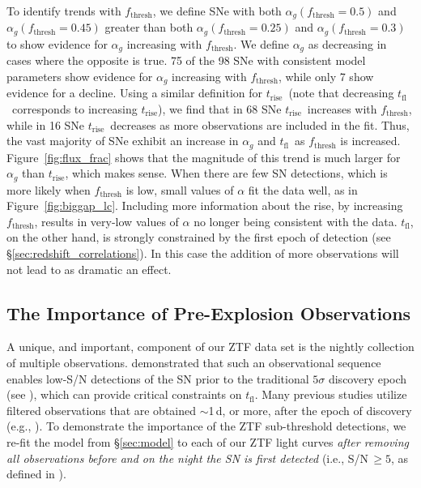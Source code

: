 \documentclass[twocolumn]{./aastex63}
\newcommand{\tfl}{$t_\mathrm{fl}$}
\newcommand{\trise}{$t_\mathrm{rise}$}
\begin{document}
To identify trends with $f_\mathrm{thresh}$, we define SNe with both
$\alpha_g(f_\mathrm{thresh} = 0.5)$ and $\alpha_g(f_\mathrm{thresh} = 0.45)$
greater than both $\alpha_g(f_\mathrm{thresh} = 0.25)$ and
$\alpha_g(f_\mathrm{thresh} = 0.3)$ to show evidence for $\alpha_g$ increasing
with $f_\mathrm{thresh}$. We define $\alpha_g$ as decreasing in cases where
the opposite is true. 75 of the 98 SNe with consistent model parameters show
evidence for $\alpha_g$ increasing with $f_\mathrm{thresh}$, while only 7 show
evidence for a decline. Using a similar definition for \trise\ (note that
decreasing \tfl\ corresponds to increasing \trise), we find that in 68 SNe
\trise\ increases with $f_\mathrm{thresh}$, while in 16 SNe \trise\ decreases
as more observations are included in the fit. Thus, the vast majority of SNe
exhibit an increase in $\alpha_g$ and \tfl\ as $f_\mathrm{thresh}$ is
increased. Figure~\ref{fig:flux_frac} shows that the magnitude of this trend
is much larger for $\alpha_g$ than \trise, which makes sense. When there are
few SN detections, which is more likely when $f_\mathrm{thresh}$ is low, small
values of $\alpha$ fit the data well, as in Figure~\ref{fig:biggap_lc}.
Including more information about the rise, by increasing $f_\mathrm{thresh}$,
results in very-low values of $\alpha$ no longer being consistent with the
data. \tfl, on the other hand, is strongly constrained by the first epoch of
detection (see \S\ref{sec:redshift_correlations}). In this case the addition
of more observations will not lead to as dramatic an effect.

\subsection{The Importance of Pre-Explosion Observations}\label{sec:pre_explosion}

A unique, and important, component of our ZTF data set is the nightly
collection of multiple observations. \citet{Yao19} demonstrated that such an
observational sequence enables low-S/N detections of the SN prior to the
traditional $5\sigma$ discovery epoch (see \citealt{Masci19}), which can
provide critical constraints on \tfl. Many previous studies utilize filtered
observations that are obtained $\sim$1\,d, or more, after the epoch of
discovery (e.g., \citealt{Riess99a,Aldering00,Ganeshalingam10,Zheng17a}). To
demonstrate the importance of the ZTF sub-threshold detections, we re-fit the
model from \S\ref{sec:model} to each of our ZTF light curves \textit{after
removing all observations before and on the night the SN is first detected}
(i.e., S/N\,$\geq 5$, as defined in \citealt{Yao19}).
\end{document}
